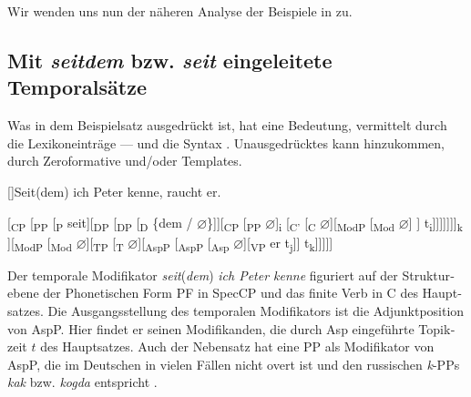 \documentclass[output=paper, colorlinks, citecolor=brown, booklanguage=german]{langscibook}
\begin{document}
\begin{otherlanguage}{german}
Wir wenden uns nun der näheren Analyse der Beispiele in  zu.

\subsection{Mit \textit{seitdem} bzw. \textit{seit} eingeleitete Temporalsätze} \label{subsec:18:3.2}

Was in dem Beispielsatz  ausgedrückt ist, hat eine Bedeutung, vermittelt durch die Lexikoneinträge — und die Syntax . Unausgedrücktes kann hinzukommen, durch Zeroformative und/oder Templates.


\begin{exe}
[]{Seit(dem) ich Peter kenne, raucht er.}
\end{exe}

\ea \label{ex:18:15} [\textsubscript{CP} [\textsubscript{PP} [\textsubscript{P} seit][\textsubscript{DP} [\textsubscript{DP} [\textsubscript{D} \{dem / $\varnothing$\}]][\textsubscript{CP} [\textsubscript{PP} $\varnothing$]\textsubscript{i} [\textsubscript{C'} [\textsubscript{C} $\varnothing$][\textsubscript{ModP} [\textsubscript{Mod} $\varnothing$] \newline
[[\textsubscript{TP} [\textsubscript{T} $\varnothing$][\textsubscript{AspP} [\textsubscript{AspP} [\textsubscript{Asp} $\varnothing$][\textsubscript{VP} ich Peter kenne]] t\textsubscript{i}]]]]]]]\textsubscript{k} \newline
[[\textsubscript{C'} [\textsubscript{C} raucht\textsubscript{j} $\varnothing$]][\textsubscript{ModP} [\textsubscript{Mod} $\varnothing$][\textsubscript{TP} [\textsubscript{T} $\varnothing$][\textsubscript{AspP} [\textsubscript{AspP} [\textsubscript{Asp} $\varnothing$][\textsubscript{VP} er t\textsubscript{j}]] t\textsubscript{k}]]]]]
\z


\noindent Der temporale Modifikator \textit{seit}(\textit{dem}) \textit{ich Peter kenne} figuriert auf der Strukturebe\-ne der Phonetischen Form PF in SpecCP und das finite Verb in C des Hauptsatzes. Die Ausgangsstellung des temporalen Modifikators ist die Adjunktposition von AspP. Hier findet er seinen Modifikanden, die durch Asp eingeführte Topikzeit $t$ des Hauptsatzes. Auch der Nebensatz hat eine PP als Modifikator von AspP, die im Deutschen in vielen Fällen nicht overt ist und den russischen \textit{k}-PPs \textit{kak} bzw. \textit{kogda} entspricht \citep{Gronn-Stechow2012}.


\end{otherlanguage}
\end{document}
